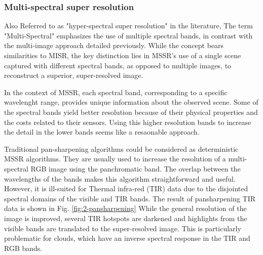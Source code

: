         \subsubsection{Multi-spectral super resolution}

        Also Referred to as "hyper-spectral super resolution" in the literature, The term "Multi-Spectral" emphasizes the use of multiple spectral bands, in contrast with the multi-image approach detailed previously. While the concept bears similarities to MISR, the key distinction lies in MSSR's use of a single scene captured with different spectral bands, as opposed to multiple images, to reconstruct a superior, super-resolved image.

        In the context of MSSR, each spectral band, corresponding to a specific wavelenght range, provides unique information about the observed scene. Some of the spectral bands yield better resolution because of their physical properties and the costs related to their sensors. Using this higher resolution bands to increase the detail in the lower bands seems like a resaonable approach.

        Traditional pan-sharpening algorithms could be considered as deterministic MSSR  algorithms. They are usually used to increase the resolution of a multi-spectral RGB image using the panchromatic band. The overlap between the wavelengths of the bands makes this algorithm straightforward and useful. However, it is ill-suited for Thermal infra-red (TIR) data due to the disjointed spectral domains of the visible and TIR bands.
        The result of pansharpening TIR data is shown in Fig. \ref{fig:2-pansharpening}  While the general resolution of the image is improved, several TIR hotspots are darkened and highlights from the visible bands are translated to the super-resolved image. This is particularly problematic for clouds, which have an inverse spectral response in the TIR and RGB bands. 
        
